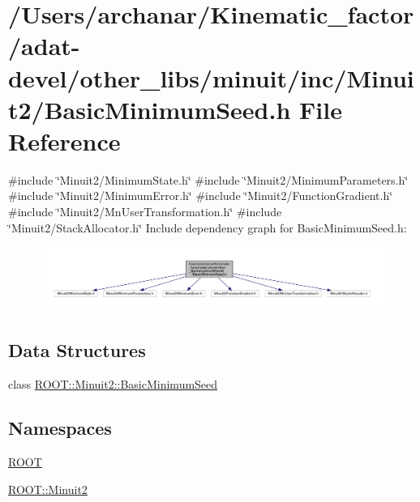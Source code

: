 \hypertarget{adat-devel_2other__libs_2minuit_2inc_2Minuit2_2BasicMinimumSeed_8h}{}\section{/\+Users/archanar/\+Kinematic\+\_\+factor/adat-\/devel/other\+\_\+libs/minuit/inc/\+Minuit2/\+Basic\+Minimum\+Seed.h File Reference}
\label{adat-devel_2other__libs_2minuit_2inc_2Minuit2_2BasicMinimumSeed_8h}
{\ttfamily \#include \char`\"{}Minuit2/\+Minimum\+State.\+h\char`\"{}}\newline
{\ttfamily \#include \char`\"{}Minuit2/\+Minimum\+Parameters.\+h\char`\"{}}\newline
{\ttfamily \#include \char`\"{}Minuit2/\+Minimum\+Error.\+h\char`\"{}}\newline
{\ttfamily \#include \char`\"{}Minuit2/\+Function\+Gradient.\+h\char`\"{}}\newline
{\ttfamily \#include \char`\"{}Minuit2/\+Mn\+User\+Transformation.\+h\char`\"{}}\newline
{\ttfamily \#include \char`\"{}Minuit2/\+Stack\+Allocator.\+h\char`\"{}}\newline
Include dependency graph for Basic\+Minimum\+Seed.\+h\+:
\nopagebreak
\begin{figure}[H]
\begin{center}
\leavevmode
\includegraphics[width=350pt]{da/de8/adat-devel_2other__libs_2minuit_2inc_2Minuit2_2BasicMinimumSeed_8h__incl}
\end{center}
\end{figure}
\subsection*{Data Structures}
\begin{DoxyCompactItemize}
\item 
class \mbox{\hyperlink{classROOT_1_1Minuit2_1_1BasicMinimumSeed}{R\+O\+O\+T\+::\+Minuit2\+::\+Basic\+Minimum\+Seed}}
\end{DoxyCompactItemize}
\subsection*{Namespaces}
\begin{DoxyCompactItemize}
\item 
 \mbox{\hyperlink{namespaceROOT}{R\+O\+OT}}
\item 
 \mbox{\hyperlink{namespaceROOT_1_1Minuit2}{R\+O\+O\+T\+::\+Minuit2}}
\end{DoxyCompactItemize}
